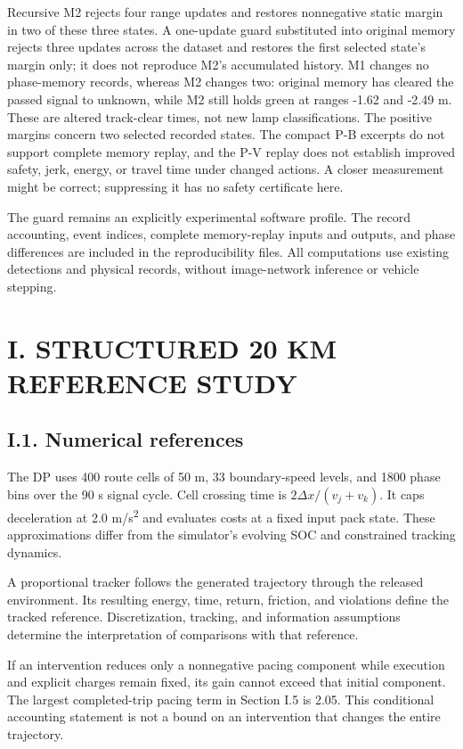 \documentclass[letterpaper,journal,onecolumn]{IEEEtran}
\begin{document}
Recursive M2 rejects four range updates and restores nonnegative static margin in two of these three states. A one-update guard substituted into original memory rejects three updates across the dataset and restores the first selected state's margin only; it does not reproduce M2's accumulated history. M1 changes no phase-memory records, whereas M2 changes two: original memory has cleared the passed signal to unknown, while M2 still holds green at ranges -1.62 and -2.49 m. These are altered track-clear times, not new lamp classifications. The positive margins concern two selected recorded states. The compact P-B excerpts do not support complete memory replay, and the P-V replay does not establish improved safety, jerk, energy, or travel time under changed actions. A closer measurement might be correct; suppressing it has no safety certificate here.

The guard remains an explicitly experimental software profile. The record accounting, event indices, complete memory-replay inputs and outputs, and phase differences are included in the reproducibility files. All computations use existing detections and physical records, without image-network inference or vehicle stepping.

\FloatBarrier{}\section*{I. STRUCTURED 20 KM REFERENCE STUDY}\setcounter{subsection}{0}

\subsection*{I.1. Numerical references}

The DP uses 400 route cells of 50 m, 33 boundary-speed levels, and 1800 phase bins over the 90 s signal cycle. Cell crossing time is \(2\Delta x/(v_j+v_k)\). It caps deceleration at 2.0 m/s\textsuperscript{2} and evaluates costs at a fixed input pack state. These approximations differ from the simulator's evolving SOC and constrained tracking dynamics.

A proportional tracker follows the generated trajectory through the released environment. Its resulting energy, time, return, friction, and violations define the tracked reference. Discretization, tracking, and information assumptions determine the interpretation of comparisons with that reference.

If an intervention reduces only a nonnegative pacing component while execution and explicit charges remain fixed, its gain cannot exceed that initial component. The largest completed-trip pacing term in Section I.5 is 2.05. This conditional accounting statement is not a bound on an intervention that changes the entire trajectory.
\end{document}
